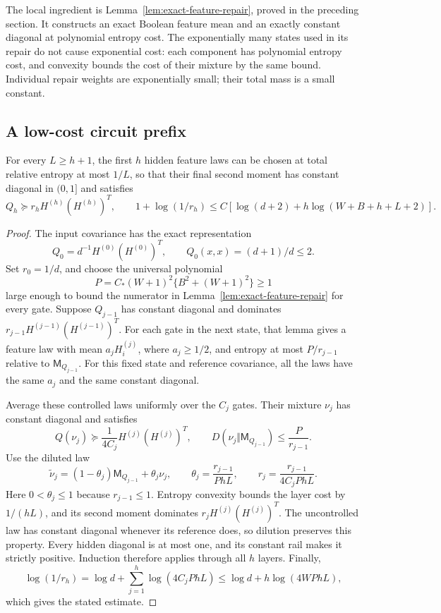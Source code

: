 The local ingredient is Lemma~\ref{lem:exact-feature-repair}, proved
in the preceding section.
It constructs an exact Boolean feature mean and an exactly constant
diagonal at polynomial entropy cost. The exponentially many states
used in its repair do not cause exponential cost: each component has
polynomial entropy cost, and convexity bounds the cost of their mixture
by the same bound. Individual repair weights are exponentially small;
their total mass is a small constant.

\subsection{A low-cost circuit prefix}

\begin{lemma}
\label{lem:controlled-circuit-prefix}
For every $L\ge h+1$, the first $h$ hidden feature laws can be chosen
at total relative entropy at most $1/L$, so that their final second
moment has constant diagonal in $(0,1]$ and satisfies
\[
 Q_h\succeq r_h H^{(h)}(H^{(h)})^T,
 \qquad
 1+\log(1/r_h)\le C[\log(d+2)+h\log(W+B+h+L+2)].
\]
\end{lemma}

\begin{proof}
The input covariance has the exact representation
\[
 Q_0=d^{-1}H^{(0)}(H^{(0)})^T,
 \qquad Q_0(x,x)=(d+1)/d\le2.
\]
Set $r_0=1/d$, and choose the universal polynomial
\[
 P=C_*(W+1)^2\{B^2+(W+1)^2\}\ge1
\]
large enough to bound the numerator in
Lemma~\ref{lem:exact-feature-repair} for every gate.
Suppose $Q_{j-1}$ has constant diagonal and dominates
$r_{j-1}H^{(j-1)}(H^{(j-1)})^T$.
For each gate in the next state, that lemma gives a feature law with
mean $a_j H^{(j)}_i$, where $a_j\ge1/2$, and entropy at most
$P/r_{j-1}$ relative to $\mathsf M_{Q_{j-1}}$.
For this fixed state and reference covariance, all the laws have the
same $a_j$ and the same constant diagonal.

Average these controlled laws uniformly over the $C_j$ gates. Their
mixture $\nu_j$ has constant diagonal and satisfies
\[
 Q(\nu_j)\succeq \frac1{4C_j}H^{(j)}(H^{(j)})^T,
 \qquad
 D(\nu_j\Vert\mathsf M_{Q_{j-1}})\le\frac P{r_{j-1}}.
\]
Use the diluted law
\[
 \widetilde\nu_j=(1-\theta_j)\mathsf M_{Q_{j-1}}+\theta_j\nu_j,
 \qquad
 \theta_j=\frac{r_{j-1}}{PhL},
 \qquad
 r_j=\frac{r_{j-1}}{4C_jPhL}.
\]
Here $0<\theta_j\le1$ because $r_{j-1}\le1$.
Entropy convexity bounds the layer cost by $1/(hL)$, and its second
moment dominates $r_jH^{(j)}(H^{(j)})^T$.
The uncontrolled law has constant diagonal whenever its reference
does, so dilution preserves this property. Every hidden diagonal is
at most one, and its constant rail makes it strictly positive.
Induction therefore applies through all $h$ layers. Finally,
\[
 \log(1/r_h)=\log d+\sum_{j=1}^h\log(4C_jPhL)
 \le\log d+h\log(4WPhL),
\]
which gives the stated estimate.
\end{proof}

